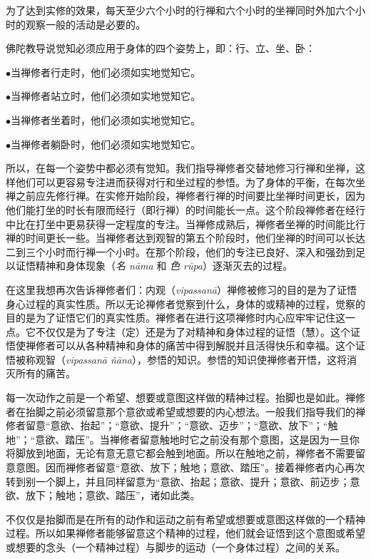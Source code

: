 为了达到实修的效果，每天至少六个小时的行禅和六个小时的坐禅同时外加六个小时的观察一般的活动是必要的。

佛陀教导说觉知必须应用于身体的四个姿势上，即：行、立、坐、卧：

{
\leftskip=1.6pc
\item{$\bullet$}当禅修者行走时，他们必须如实地觉知它。
\item{$\bullet$}当禅修者站立时，他们必须如实地觉知\1它。
\item{$\bullet$}当禅修者坐着时，他们必须如实地觉知它。
\item{$\bullet$}当禅修者躺卧时，他们必须如实地觉知它。

}

所以，在每一个姿势中都必须有觉知。我们指导禅修者交替地修习行禅和坐禅，这样他们可以更容易专注进而获得对行和坐过程的参悟。为了身体的平衡，在每次坐禅之前应先修行禅。在实修开始阶段，禅修者行禅的时间要比坐禅时间更长，因为他们能打坐的时长有限而经行（即行禅）的时间能长一点。这个阶段禅修者在经行中比在打坐中更易获得一定程度的专注。当禅修成熟后，禅修者坐禅的时间能比行禅的时间更长一些。当禅修者达到观智的第五个阶段时，他们坐禅的时间可以长达二到三个小时而行禅一个小时。在那个阶段，他们的专注已良好、深入和强劲到足以证悟精神和身体现象（{\it 名 n\=ama} 和 {\it 色 r\=upa}）逐渐灭去的过程。

在这里我想再次告诉禅修者们：内观（{\it vipassan\=a}）禅修被修习的目的是为了证悟身心过程的真实性质。所以无论禅修者觉察到什么，身体的或精神的过程，觉察的目的是为了证悟它们的真实性质。禅修者在进行这项禅修时内心应牢牢记住这一点。它不仅仅是为了专注（定）还是为了对精神和身体过程的证悟（慧）。这个证悟使禅修者可以从各种精神和身体的痛苦中得到解脱并且活得快乐和\1幸福。这个证悟被称观智（{\it vipassan\=a \~n\=ana}），参悟的知识。参悟的知识使禅修者开悟，这将消灭所有的痛苦。

每一次动作之前是一个希望、想要或意图这样做的精神过程。抬脚也是如此。禅修者在抬脚之前必须留意那个意欲或希望或想要的内心想法。一般我们指导我们的禅修者留意“意欲、抬起”；“意欲、提升”；“意欲、迈步”；“意欲、放下”；“触地”；“意欲、踏压”。当禅修者留意触地时它之前没有那个意图，这是因为一旦你将脚放到地面，无论有意无意它都会触到地面。所以在触地之前，禅修者不需要留意意图。因而禅修者留意“意欲、放下；触地；意欲、踏压”。接着禅修者内心再次转到别一个脚上，并且同样留意为“意欲、抬起；意欲、提升；意欲、前迈步；意欲、放下；触地；意欲、踏压”，诸如此类。

不仅仅是抬脚而是在所有的动作和运动之前有希望或想要或意图这样做的一个精神过程。所以如果禅修者能够留意这个精神的过程，他们就会证悟到这个意图或希望或想要的念头（一个精神过程）与脚步的运动（一个身体过程）之间的关系。

